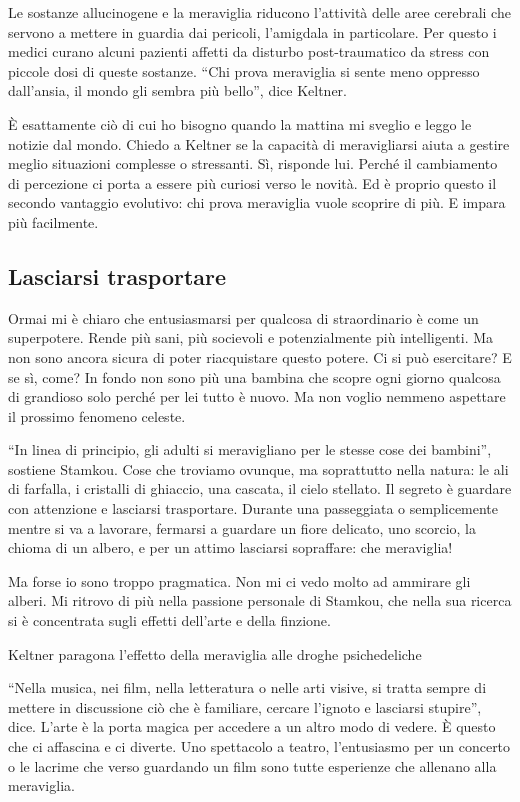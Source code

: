 \documentclass[11pt]{report}
\begin{document}
Le sostanze allucinogene e la meraviglia riducono l’attività delle aree cerebrali che servono a mettere in guardia dai pericoli, l’amigdala in particolare. Per questo i medici curano alcuni pazienti affetti da disturbo post-traumatico da stress con piccole dosi di queste sostanze. “Chi prova meraviglia si sente meno oppresso dall’ansia, il mondo gli sembra più bello”, dice Keltner.

È esattamente ciò di cui ho bisogno quando la mattina mi sveglio e leggo le notizie dal mondo. Chiedo a Keltner se la capacità di meravigliarsi aiuta a gestire meglio situazioni complesse o stressanti. Sì, risponde lui. Perché il cambiamento di percezione ci porta a essere più curiosi verso le novità. Ed è proprio questo il secondo vantaggio evolutivo: chi prova meraviglia vuole scoprire di più. E impara più facilmente.

\subsection*{Lasciarsi trasportare}

Ormai mi è chiaro che entusiasmarsi per qualcosa di straordinario è come un superpotere. Rende più sani, più socievoli e potenzialmente più intelligenti. Ma non sono ancora sicura di poter riacquistare questo potere. Ci si può esercitare? E se sì, come? In fondo non sono più una bambina che scopre ogni giorno qualcosa di grandioso solo perché per lei tutto è nuovo. Ma non voglio nemmeno aspettare il prossimo fenomeno celeste.

“In linea di principio, gli adulti si meravigliano per le stesse cose dei bambini”, sostiene Stamkou. Cose che troviamo ovunque, ma soprattutto nella natura: le ali di farfalla, i cristalli di ghiaccio, una cascata, il cielo stellato. Il segreto è guardare con attenzione e lasciarsi trasportare. Durante una passeggiata o semplicemente mentre si va a lavorare, fermarsi a guardare un fiore delicato, uno scorcio, la chioma di un albero, e per un attimo lasciarsi sopraffare: che meraviglia!

Ma forse io sono troppo pragmatica. Non mi ci vedo molto ad ammirare gli alberi. Mi ritrovo di più nella passione personale di Stamkou, che nella sua ricerca si è concentrata sugli effetti dell’arte e della finzione.

Keltner paragona l’effetto della meraviglia alle droghe psichedeliche

“Nella musica, nei film, nella letteratura o nelle arti visive, si tratta sempre di mettere in discussione ciò che è familiare, cercare l’ignoto e lasciarsi stupire”, dice. L’arte è la porta magica per accedere a un altro modo di vedere. È questo che ci affascina e ci diverte. Uno spettacolo a teatro, l’entusiasmo per un concerto o le lacrime che verso guardando un film sono tutte esperienze che allenano alla meraviglia.
\end{document}
